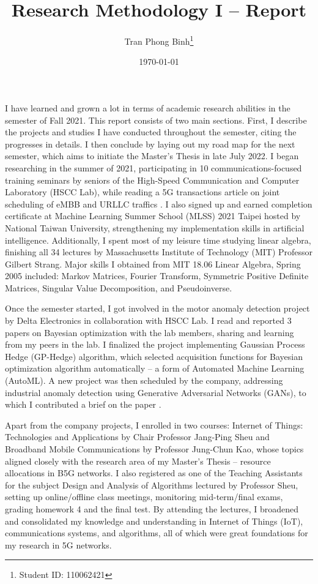 \documentclass[12pt, a4paper, onside]{article}
\title{\textbf{Research Methodology I -- Report}}
\author{Tran Phong Binh\thanks{Student ID: 110062421}}
\affil{High-Speed Communication and Computer Laboratory, Department of Computer Science, National Tsing Hua University}
\date{\today}
\begin{document}
\maketitle

I have learned and grown a lot in terms of academic research abilities in the semester of Fall 2021. This report consists of two main sections. First, I describe the projects and studies I have conducted throughout the semester, citing the progresses in details. I then conclude by laying out my road map for the next semester, which aims to initiate the Master's Thesis in late July 2022.
I began researching in the summer of 2021, participating in 10 communications-focused training seminars by seniors of the High-Speed Communication and Computer Laboratory (HSCC Lab), while reading a 5G transactions article on joint scheduling of eMBB and URLLC traffics \cite{5gJointACM}. I also signed up and earned completion certificate at Machine Learning Summer School (MLSS) 2021 Taipei hosted by National Taiwan University, strengthening my implementation skills in artificial intelligence. Additionally, I spent most of my leisure time studying linear algebra, finishing all 34 lectures by Massachusetts Institute of Technology (MIT) Professor Gilbert Strang. Major skills I obtained from MIT 18.06 Linear Algebra, Spring 2005 included: Markov Matrices, Fourier Transform, Symmetric Positive Definite Matrices, Singular Value Decomposition, and Pseudoinverse.

Once the semester started, I got involved in the motor anomaly detection project by Delta Electronics in collaboration with HSCC Lab. I read and reported 3 papers on Bayesian optimization \cite{bayesPortfolio, bayesSearch, bayesBandit} with the lab members, sharing and learning from my peers in the lab. I finalized the project implementing Gaussian Process Hedge (GP-Hedge) algorithm, which selected acquisition functions for Bayesian optimization algorithm automatically -- a form of Automated Machine Learning (AutoML). A new project was then scheduled by the company, addressing industrial anomaly detection using Generative Adversarial Networks (GANs), to which I contributed a brief on the paper \cite{efficientGAN}.

Apart from the company projects, I enrolled in two courses: Internet of Things: Technologies and Applications by Chair Professor Jang-Ping Sheu and Broadband Mobile Communications by Professor Jung-Chun Kao, whose topics aligned closely with the research area of my Master's Thesis -- resource allocations in B5G networks. I also registered as one of the Teaching Assistants for the subject Design and Analysis of Algorithms lectured by Professor Sheu, setting up online/offline class meetings, monitoring mid-term/final exams, grading homework 4 and the final test. By attending the lectures, I broadened and consolidated my knowledge and understanding in Internet of Things (IoT), communications systems, and algorithms, all of which were great foundations for my research in 5G networks.
\end{document}
